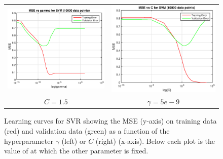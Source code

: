 \documentclass[12pt] {article}
\renewcommand{\baselinestretch}{1.3} %
\begin{document}
\renewcommand{\baselinestretch}{1.0} %
\begin{figure}[h!] \centering
\begin{tabular}{cc}
\includegraphics[width=.45\textwidth]{figdir/svmgamma10000.eps} &
\includegraphics[width=.45\textwidth]{figdir/svmc10000.eps} \\
$C=1.5$ & $\gamma=5e-9$ \\
\end{tabular}
\caption{Learning curves for SVR showing the MSE (y-axis) on training data (red) and validation data (green) as a function of the hyperparameter $\gamma$ (left) or $C$ (right) (x-axis). Below each plot is the value of at which the other parameter is fixed.}
\end{figure}
\renewcommand{\baselinestretch}{1.3} %
\end{document}

